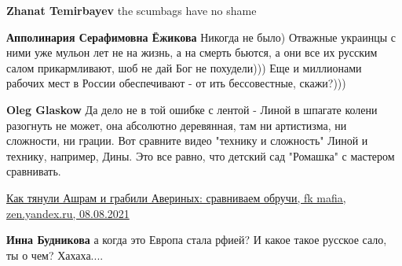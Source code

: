 \begin{itemize}
\begin{itemize}
 
\textbf{Zhanat Temirbayev} the scumbags have no shame

 
\textbf{Апполинария Серафимовна Ёжикова} Никогда не было) Отважные украинцы с ними уже мульон лет не на жизнь, а на смерть бьются, а они все их русским салом прикармливают, шоб не дай Бог не похудели))) Еще и миллионами рабочих мест в России обеспечивают - от ить бессовестные, скажи?)))

 
\textbf{Oleg Glaskow} Да дело не в той ошибке с лентой - Линой в шпагате колени разогнуть не может, она абсолютно деревянная, там ни артистизма, ни сложности, ни грации. Вот сравните видео "технику и сложность" Линой и технику, например, Дины. Это все равно, что детский сад "Ромашка" с мастером сравнивать.

\href{https://zen.yandex.ru/media/id/5e0fb60bfc69ab00aec4e090/kak-tianuli-ashram-i-grabili-averinyh-sravnivaem-obruchi-610f026e965a1f3ee3698372}{%
Как тянули Ашрам и грабили Авериных: сравниваем обручи, fk mafia, zen.yandex.ru, 08.08.2021%
}

 
\textbf{Инна Будникова} а когда это Европа стала рфией? И какое такое русское сало, ты о чем? Хахаха....

 

\end{itemize}
\end{itemize}
